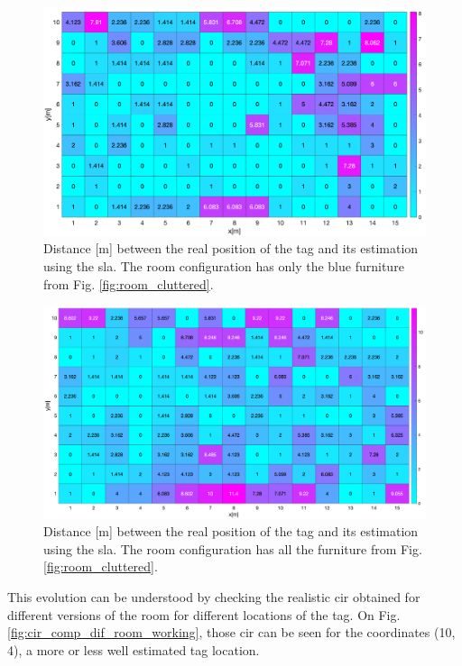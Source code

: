 \begin{figure}[H]
\centering
\includegraphics[width=.9\linewidth]{Images/cluttered_room.png}
\caption{Distance [m] between the real position of the tag and its estimation using the \gls{sla}. The room configuration has only the blue furniture from Fig. \ref{fig:room_cluttered}.
\label{fig:dist_clut_room}}
\end{figure}

\begin{figure}[H]
\centering
\includegraphics[width=.9\linewidth]{Images/sla_cluttered_lot.png}
\caption{Distance [m] between the real position of the tag and its estimation using the \gls{sla}. The room configuration has all the furniture from Fig. \ref{fig:room_cluttered}.\label{fig:dist_lot_clut_room}}
\end{figure}

This evolution can be understood by checking the realistic \gls{cir} obtained for different versions of the room for different locations of the tag. On Fig. \ref{fig:cir_comp_dif_room_working}, those \gls{cir} can be seen for the coordinates (10, 4), a more or less well estimated tag location.


